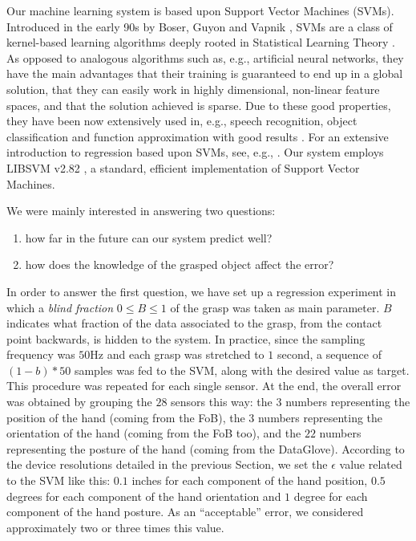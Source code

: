 Our machine learning system is based upon Support Vector Machines
(SVMs). Introduced in the early 90s by Boser, Guyon and Vapnik
\cite{BGV92}, SVMs are a class of kernel-based learning algorithms
deeply rooted in Statistical Learning Theory \cite{v-edbed-82}. As
opposed to analogous algorithms such as, e.g., artificial neural
networks, they have the main advantages that their training is
guaranteed to end up in a global solution, that they can easily work
in highly dimensional, non-linear feature spaces, and that the
solution achieved is sparse. Due to these good properties, they have
been now extensively used in, e.g., speech recognition, object
classification and function approximation with good results
\cite{Cristianini00}. For an extensive introduction to regression
based upon SVMs, see, e.g., \cite{SmolaTut2004}. Our system employs
LIBSVM v2.82 \cite{ChangL01}, a standard, efficient implementation of
Support Vector Machines.

We were mainly interested in answering two questions:

\begin{enumerate}

  \item how far in the future can our system predict well?

  \item how does the knowledge of the grasped object affect the error?

\end{enumerate}

In order to answer the first question, we have set up a regression
experiment in which a \emph{blind fraction} $0 \leq B \leq 1$ of the
grasp was taken as main parameter. $B$ indicates what fraction of the
data associated to the grasp, from the contact point backwards, is
hidden to the system. In practice, since the sampling frequency was
$50$Hz and each grasp was stretched to $1$ second, a sequence of
$(1-b)*50$ samples was fed to the SVM, along with the desired value as
target. This procedure was repeated for each single sensor. At the
end, the overall error was obtained by grouping the $28$ sensors this
way: the $3$ numbers representing the position of the hand (coming
from the FoB), the $3$ numbers representing the orientation of the
hand (coming from the FoB too), and the $22$ numbers representing the
posture of the hand (coming from the DataGlove). According to the
device resolutions detailed in the previous Section, we set the
$\epsilon$ value related to the SVM \cite{SmolaTut2004} like this:
$0.1$ inches for each component of the hand position, $0.5$ degrees
for each component of the hand orientation and $1$ degree for each
component of the hand posture. As an ``acceptable'' error, we
considered approximately two or three times this value.

